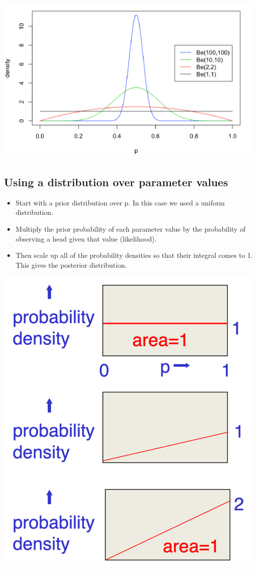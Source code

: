 \documentclass[11pt]{article}
\theoremstyle{definition}
\begin{document}
\includegraphics[width=\textwidth]{5.png}

\subsection{Using a distribution over parameter values}
\begin{itemize}
    \item Start with a prior distribution over
    p. In this case we used a uniform
    distribution.
    \item Multiply the prior probability of
    each parameter value by the
    probability of observing a head
    given that value (likelihood).
    \item Then scale up all of the probability
    densities so that their integral
    comes to 1. This gives the
    posterior distribution.
\end{itemize}

\includegraphics[width=\textwidth]{6.png}
\end{document}
